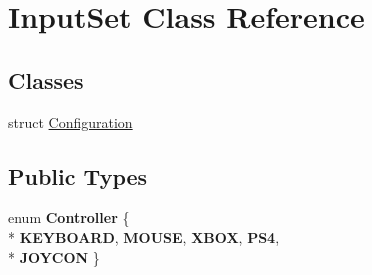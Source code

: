 \hypertarget{class_input_set}{\section{Input\-Set Class Reference}
\label{class_input_set}
}
\subsection*{Classes}
\begin{DoxyCompactItemize}
\item 
struct \hyperlink{struct_input_set_1_1_configuration}{Configuration}
\end{DoxyCompactItemize}
\subsection*{Public Types}
\begin{DoxyCompactItemize}
\item 
enum {\bfseries Controller} \{ \\*
{\bfseries K\-E\-Y\-B\-O\-A\-R\-D}, 
{\bfseries M\-O\-U\-S\-E}, 
{\bfseries X\-B\-O\-X}, 
{\bfseries P\-S4}, 
\\*
{\bfseries J\-O\-Y\-C\-O\-N}
 \}
\end{DoxyCompactItemize}

